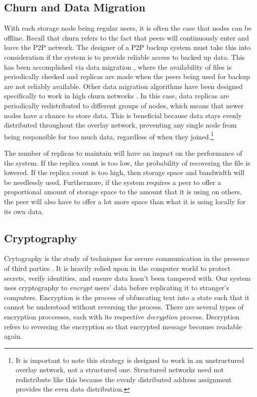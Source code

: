 \documentclass[12pt]{report}
\begin{document}
\subsection{Churn and Data Migration} \label{sec:churn}
With each storage node being regular users, it is often the case that nodes can be offline. Recall that churn refers to the fact that peers will continuously enter and leave the P2P network. The designer of a P2P backup system must take this into consideration if the system is to provide reliable access to backed up data. This has been accomplished via data migration \cite{pStore,PeerStore}, where the availability of files is periodically checked and replicas are made when the peers being used for backup are not reliably available. Other data migration algorithms have been designed specifically to work in high churn networks \cite{StorageSearchP2PNetworks}. In this case, data replicas are periodically redistributed to different groups of nodes, which means that newer nodes have a chance to store data. This is beneficial because data stays evenly distributed throughout the overlay network, preventing any single node from being responsible for too much data, regardless of when they joined.\footnote{It is important to note this strategy is designed to work in an unstructured overlay network, not a structured one. Structured networks need not redistribute like this because the evenly distributed address assignment provides the even data distribution.}

The number of replicas to maintain will have an impact on the performance of the system. If the replica count is too low, the probability of recovering the  file is lowered. If the replica count is too high, then storage space and bandwidth will be needlessly used. Furthermore, if the system requires a peer to offer a proportional amount of storage space to the amount that it is using on others, the peer will also have to offer a lot more space than what it is using locally for its own data. %

\subsection{Cryptography} \label{sec:crypto}
Crytography is the study of techniques for secure communication in the presence of third parties \cite{cryptoDef}. It is heavily relied upon in the computer world to protect secrets, verify identities, and ensure data hasn't been tampered with. Our system uses cryptography to \textit{encrypt} users' data before replicating it to stranger's computers. Encryption is the process of obfuscating text into a state such that it cannot be understood without reversing the process. There are several types of encryption proccesses, each with its respective \textit{decryption} process. Decryption refers to reversing the encryption so that encrypted message becomes readable again.
\end{document}
